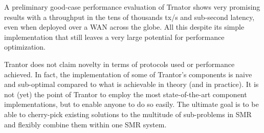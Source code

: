 \documentclass{article}
\begin{document}
A preliminary good-case performance evaluation of Trnator shows very promising results
with a throughput in the tens of thousands tx/s and sub-second latency,
even when deployed over a WAN across the globe.
All this despite its simple implementation that still leaves a very large potential for performance optimization.

Trantor does not claim novelty in terms of protocols used or performance achieved.
In fact, the implementation of some of Trantor’s components is naive and sub-optimal compared to what is achievable in theory (and in practice).
It is not (yet) the point of Trantor to employ the most state-of-the-art component implementations, but to enable anyone to do so easily.
The ultimate goal is to be able to cherry-pick existing solutions to the multitude of sub-problems in SMR and flexibly combine them within one SMR system.

\newpage



\end{document}
